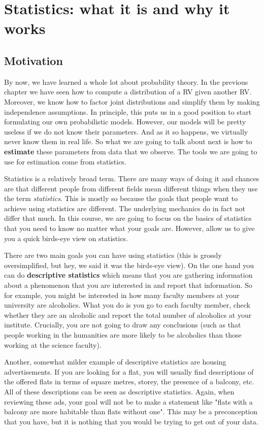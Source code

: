 \chapter{Statistics: what it is and why it works}

\section{Motivation}

By now, we have learned a whole lot about probability theory. In the previous chapter we have seen
how to compute a distribution of a RV given another RV. Moreover, we know how to factor joint distributions and simplify them by making
independence assumptions. In principle, this puts us in a good position to start formulating our
own probabilistic models. However, our models will be pretty useless if we do not know their parameters. And as
it so happens, we virtually never know them in real life. So what we are going to talk about next is how to \textbf{estimate}
these parameters from data that we observe. The tools we are going to use for estimation come from statistics.

Statistics is a relatively broad term. There are many ways of doing it and chances are that different people from different
fields mean different things when they use the term \textit{statistics}. This is mostly so because the goals that people 
want to achieve using statistics are different. The underlying mechanics do in fact not differ that much. In this course,
we are going to focus on the basics of statistics that you need to know no matter what your goals are. However, allow us
to give you a quick birds-eye view on statistics. 

There are two main goals you can have using statistics (this is grossly oversimplified, but hey, we said it was the birds-eye
view). On the one hand you can do \textbf{descriptive statistics} which means that you are gathering information about a phenomenon
that you are interested in and report that information. So for example, you might be interested in how many faculty members
at your university are alcoholics. What you do is you go to each faculty member, check whether they are an alcoholic
and report the total number of alcoholics at your institute. Crucially, you are not going to draw any conclusions (such as that people working in the humanities are more
likely to be alcoholics than those working at the science faculty).

Another, somewhat milder example of descriptive statistics are housing advertisements. If you are looking for a flat, you will usually
find descriptions of the offered flats in terms of square metres, storey, the presence of a balcony, etc. All of these descriptions
can be seen as descriptive statistics. Again, when reviewing these ads, your goal will not be to make a statement like "flats
with a balcony are more habitable than flats without one". This may be a preconception that you have, but it is nothing that
you would be trying to get out of your data.

